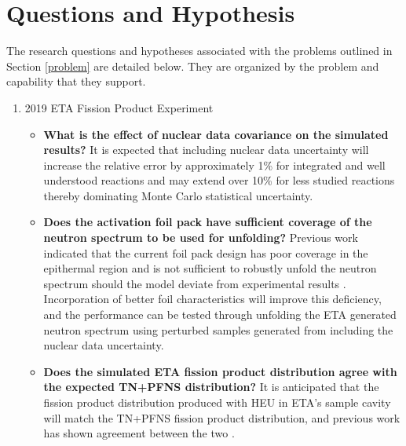 \section{Questions and Hypothesis}
The research questions and hypotheses associated with the problems outlined in Section \ref{problem} are detailed below.  
They are organized by the problem and capability that they support.

\begin{enumerate}
	\item 2019 ETA Fission Product Experiment
	
	\begin{itemize}
		\item \textbf{What is the effect of nuclear data covariance on the simulated results?} It is expected that including nuclear data uncertainty will increase the relative error by approximately 1\% for integrated and well understood reactions and may extend over 10\% for less studied reactions thereby dominating Monte Carlo statistical uncertainty. 
		
		\item \textbf{Does the activation foil pack have sufficient coverage of the neutron spectrum to be used for unfolding?} Previous work indicated that the current foil pack design has poor coverage in the epithermal region and is not sufficient to robustly unfold the neutron spectrum should the model deviate from experimental results \cite{BEVINS2019}.
		 Incorporation of better foil characteristics will improve this deficiency, and the performance can be tested through unfolding the ETA generated neutron spectrum using perturbed samples generated from including the nuclear data uncertainty.
		 
 		\item \textbf{Does the simulated ETA fission product distribution agree with the expected TN+PFNS distribution?} It is anticipated that the fission product distribution produced with HEU in ETA's sample cavity will match the TN+PFNS fission product distribution, and  previous work has shown agreement between the two \cite{Bevins2018}.
		
    	

\end{itemize}
\end{enumerate}
